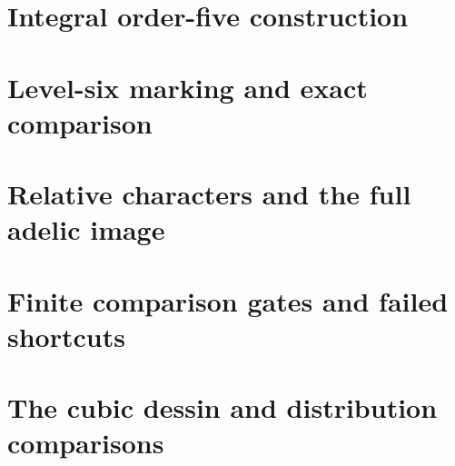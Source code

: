 \documentclass[11pt]{article}
\begin{document}
\section{Integral order-five construction}





\section{Level-six marking and exact comparison}



\section{Relative characters and the full adelic image}



\section{Finite comparison gates and failed shortcuts}





















\section{The cubic dessin and distribution comparisons}





\end{document}
